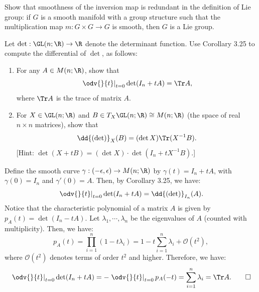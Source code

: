 \begin{problem}[2]
  Show that smoothness of the inversion map is redundant in the definition of Lie group: if $G$ is a smooth manifold with a group structure such that the multiplication map $m : G \times G \to G$ is smooth, then $G$ is a Lie group.

  \vspace{0.5em}

  \noindent{[Hint: show that the map $F : G \times G \to G \times G$ defined by $F(g, h) = (g, gh)$ is a bijective local diffeomorphism.]}
\end{problem}

\begin{solution}
\end{solution}

\begin{problem}[3]
  Let $\det : \GL(n; \R) \to \R$ denote the determinant function. Use Corollary 3.25 to compute the differential of $\det$, as follows:
  \begin{enumerate}
    \item For any $A \in M(n; \R)$, show that
      \[%
        \left.\odv{}{t}\right\rvert_{t=0} \det(I_n + tA) = \Tr A
      ,\]%
      where $\Tr A$ is the trace of matrix $A$.
    \item For $X \in \GL(n; \R)$ and $B \in T_X\GL(n; \R) \cong M(n; \R)$ (the space of real $n \times n$ matrices), show that
      \[%
        \dd{(\det)}_X(B) = (\det X)\Tr(X^{-1} B)
      .\]%
      [Hint: $\det(X + tB) = (\det X) \cdot \det(I_n + tX^{-1}B)$.]
  \end{enumerate}
\end{problem}

\begin{solution}[(i)]
  Define the smooth curve $\gamma : (-\epsilon, \epsilon) \to M(n; \R)$ by $\gamma(t) = I_n + tA$, with $\gamma(0) = I_n$ and $\gamma'(0) = A$. Then, by Corollary 3.25, we have:
  \[%
    \left.\odv{}{t}\right\rvert_{t=0} \det(I_n + tA) = \dd{(\det)}_{I_n}(A)
  .\]%
  Notice that the characteristic polynomial of a matrix $A$ is given by $p_A(t) = \det(I_n - tA)$. Let $\lambda_1, \cdots, \lambda_n$ be the eigenvalues of $A$ (counted with multiplicity). Then, we have:
  \[%
    p_A(t) = \prod_{i=1}^n (1 - t\lambda_i) = 1 - t\sum_{i=1}^n \lambda_i + \mathcal{O}(t^2)
  ,\]%
  where $\mathcal{O}(t^2)$ denotes terms of order $t^2$ and higher. Therefore, we have:
  \[%
    \left.\odv{}{t}\right\rvert_{t=0} \det(I_n + tA) = -\left.\odv{}{t}\right\rvert_{t=0} p_A(-t) = \sum_{i=1}^n \lambda_i = \Tr A
  .\qedhere\]%
\end{solution}

